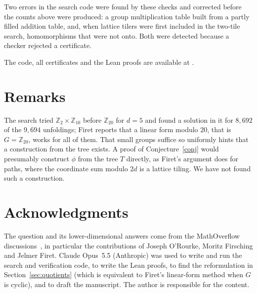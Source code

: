 \documentclass[11pt]{amsart}
\theoremstyle{definition}
\theoremstyle{remark}
\newcommand{\Z}{\mathbb{Z}}
\begin{document}
Two errors in the search code were found by these checks and corrected before the counts above were produced: a group multiplication table built from a partly filled addition table, and, when lattice tilers were first included in the two-tile search, homomorphisms that were not onto. Both were detected because a checker rejected a certificate.

The code, all certificates and the Lean proofs are available at \cite{repo}.

\section{Remarks}

The search tried $\Z_2\times\Z_{10}$ before $\Z_{20}$ for $d=5$ and found a solution in it for $8{,}692$ of the $9{,}694$ unfoldings; Firet reports that a linear form modulo $20$, that is $G=\Z_{20}$, works for all of them. That small groups suffice so uniformly hints that a construction from the tree exists. A proof of Conjecture~\ref{conj} would presumably construct $\phi$ from the tree $T$ directly, as Firet's argument does for paths, where the coordinate sum modulo $2d$ is a lattice tiling. We have not found such a construction.

\section*{Acknowledgments}

The question and its lower-dimensional answers come from the MathOverflow discussions~\cite{MO199097,MO392890}, in particular the contributions of Joseph O'Rourke, Moritz Firsching and Jelmer Firet. Claude Opus~5.5 (Anthropic) was used to write and run the search and verification code, to write the Lean proofs, to find the reformulation in Section~\ref{sec:quotients} (which is equivalent to Firet's linear-form method when $G$ is cyclic), and to draft the manuscript. The author is responsible for the content.
\end{document}

